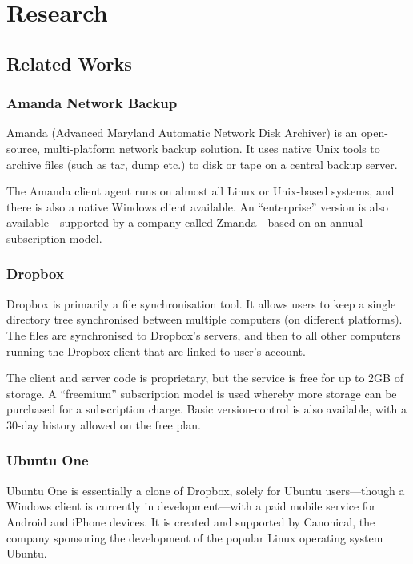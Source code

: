 \section{Research}

\subsection{Related Works}

\subsubsection{Amanda Network Backup}

Amanda (Advanced Maryland Automatic Network Disk Archiver) is an open-source,
multi-platform network backup solution. It uses native Unix tools to archive
files (such as tar, dump etc.) to disk or tape on a central backup server.

The Amanda client agent runs on almost all Linux or Unix-based systems, and
there is also a native Windows client available. An ``enterprise'' version is
also available---supported by a company called Zmanda---based on an annual
subscription model.

\subsubsection{Dropbox}

Dropbox is primarily a file synchronisation tool. It allows users to keep
a single directory tree synchronised between multiple computers (on different
platforms). The files are synchronised to Dropbox's servers, and then to all
other computers running the Dropbox client that are linked to user's account.

The client and server code is proprietary, but the service is free for up to
2GB of storage. A ``freemium'' subscription model is used whereby more storage
can be purchased for a subscription charge. Basic version-control is also
available, with a 30-day history allowed on the free plan.

\subsubsection{Ubuntu One}

Ubuntu One is essentially a clone of Dropbox, solely for Ubuntu users---though
a Windows client is currently in development---with a paid mobile service for
Android and iPhone devices. It is created and supported by Canonical, the
company sponsoring the development of the popular Linux operating system
Ubuntu.

